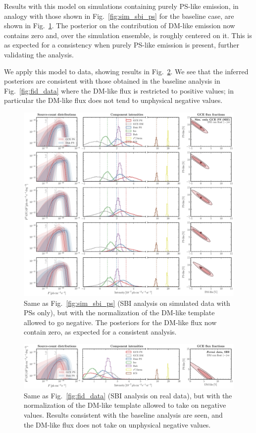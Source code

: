 \documentclass[prd,aps,10pt,nofootinbib,twocolumn,superscriptaddress,preprintnumbers,balancelastpage,longbibliography,floatfix]{revtex4-2}
\begin{document}
Results with this model on simulations containing purely PS-like emission, in analogy with those shown in Fig.~\ref{fig:sim_sbi_ps} for the baseline case, are shown in Fig.~\ref{fig:sim_sbi_ps_neg}. The posterior on the contribution of DM-like emission now contains zero and, over the simulation ensemble, is roughly centered on it. This is as expected for a consistency when purely PS-like emission is present, further validating the analysis.

We apply this model to \Fermi data, showing results in Fig.~\ref{fig:fermi_sbi_neg}. We see that the inferred posteriors are consistent with those obtained in the baseline analysis in Fig.~\ref{fig:fid_data} where the DM-like flux is restricted to positive values; in particular the DM-like flux does not tend to unphysical negative values.


%
\begin{figure}[!htbp]
\centering
\includegraphics[width=1.\textwidth]{plots/sim_sbi_ps_neg.pdf}
\caption{Same as Fig.~\ref{fig:sim_sbi_ps} (SBI analysis on simulated \Fermi data with PSs only), but with the normalization of the DM-like template allowed to go negative. The posteriors for the DM-like flux now contain zero, as expected for a consistent analysis.}
\label{fig:sim_sbi_ps_neg}
\end{figure}
%

%
\begin{figure}[!htbp]
\centering
\includegraphics[width=1.\textwidth]{plots/fermi_sbi_neg_dm.pdf}
\caption{Same as Fig.~\ref{fig:fid_data} (SBI analysis on real \Fermi data), but with the normalization of the DM-like template allowed to take on negative values. Results consistent with the baseline analysis are seen, and the DM-like flux does not take on unphysical negative values.}
\label{fig:fermi_sbi_neg}
\end{figure}
%


\clearpage



\end{document}
